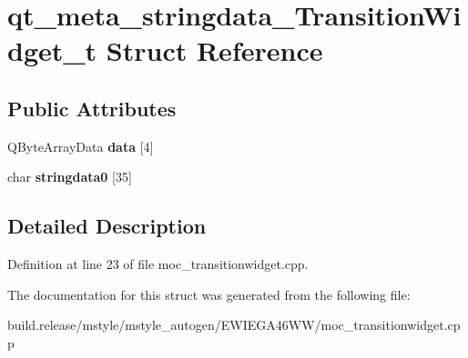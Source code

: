 \hypertarget{structqt__meta__stringdata___transition_widget__t}{}\section{qt\+\_\+meta\+\_\+stringdata\+\_\+\+Transition\+Widget\+\_\+t Struct Reference}
\label{structqt__meta__stringdata___transition_widget__t}
\subsection*{Public Attributes}
\begin{DoxyCompactItemize}
\item 
\mbox{\label{structqt__meta__stringdata___transition_widget__t_a49e1fda0891cec9f645d8ede82b61209}} 
Q\+Byte\+Array\+Data {\bfseries data} \mbox{[}4\mbox{]}
\item 
\mbox{\label{structqt__meta__stringdata___transition_widget__t_a73842ef7712e09be5842d34b6a4a484f}} 
char {\bfseries stringdata0} \mbox{[}35\mbox{]}
\end{DoxyCompactItemize}


\subsection{Detailed Description}


Definition at line 23 of file moc\+\_\+transitionwidget.\+cpp.



The documentation for this struct was generated from the following file\+:\begin{DoxyCompactItemize}
\item 
build.\+release/mstyle/mstyle\+\_\+autogen/\+E\+W\+I\+E\+G\+A46\+W\+W/moc\+\_\+transitionwidget.\+cpp\end{DoxyCompactItemize}
